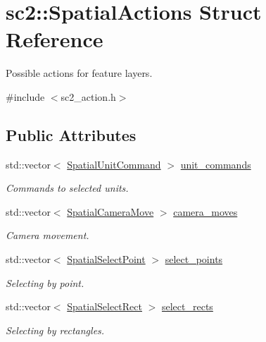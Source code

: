 \hypertarget{structsc2_1_1_spatial_actions}{}\section{sc2\+:\+:Spatial\+Actions Struct Reference}
\label{structsc2_1_1_spatial_actions}


Possible actions for feature layers.  




{\ttfamily \#include $<$sc2\+\_\+action.\+h$>$}

\subsection*{Public Attributes}
\begin{DoxyCompactItemize}
\item 
\mbox{\label{structsc2_1_1_spatial_actions_a1ab964fd7e078894f25c7dddd881169c}} 
std\+::vector$<$ \hyperlink{structsc2_1_1_spatial_unit_command}{Spatial\+Unit\+Command} $>$ \hyperlink{structsc2_1_1_spatial_actions_a1ab964fd7e078894f25c7dddd881169c}{unit\+\_\+commands}
\begin{DoxyCompactList}\small\item\em Commands to selected units. \end{DoxyCompactList}\item 
\mbox{\label{structsc2_1_1_spatial_actions_aefbcb5de0d5ccb8871b73cf61682135d}} 
std\+::vector$<$ \hyperlink{structsc2_1_1_spatial_camera_move}{Spatial\+Camera\+Move} $>$ \hyperlink{structsc2_1_1_spatial_actions_aefbcb5de0d5ccb8871b73cf61682135d}{camera\+\_\+moves}
\begin{DoxyCompactList}\small\item\em Camera movement. \end{DoxyCompactList}\item 
\mbox{\label{structsc2_1_1_spatial_actions_ab836b6a65f6267552aa74d403aef7f0a}} 
std\+::vector$<$ \hyperlink{structsc2_1_1_spatial_select_point}{Spatial\+Select\+Point} $>$ \hyperlink{structsc2_1_1_spatial_actions_ab836b6a65f6267552aa74d403aef7f0a}{select\+\_\+points}
\begin{DoxyCompactList}\small\item\em Selecting by point. \end{DoxyCompactList}\item 
\mbox{\label{structsc2_1_1_spatial_actions_abc60e7ad122ae7aec22d35f960c04d12}} 
std\+::vector$<$ \hyperlink{structsc2_1_1_spatial_select_rect}{Spatial\+Select\+Rect} $>$ \hyperlink{structsc2_1_1_spatial_actions_abc60e7ad122ae7aec22d35f960c04d12}{select\+\_\+rects}
\begin{DoxyCompactList}\small\item\em Selecting by rectangles. \end{DoxyCompactList}\end{DoxyCompactItemize}


